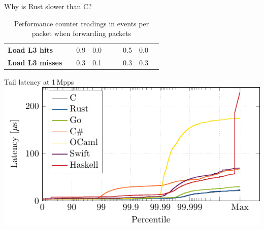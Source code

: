 \documentclass[NET,english,aspectratio=169,notitleframe]{tumbeamer}
\begin{document}
\begin{frame}{Why is Rust slower than C?}
\begin{table}[t]
\begin{tabular}{lrrrrrrrr}
\color{TUMLightGray}		\textbf{Load L3 hits}                     & &\color{TUMLightGray} 0.9 &\color{TUMLightGray} 0.0      &&& \color{TUMLightGray}0.5 & \color{TUMLightGray}0.0 \\
\color{TUMLightGray}		\textbf{Load L3 misses}               & & \color{TUMLightGray}0.3 &\color{TUMLightGray} 0.1         &&& \color{TUMLightGray}0.3 & \color{TUMLightGray}0.3 \\
		\bottomrule
	\end{tabular}
	\caption{Performance counter readings in events per packet when forwarding packets}
	\label{tbl:rust-profiling}
	\vspace{-3em}
\end{table}
\end{frame}




%
%
%
%

\begin{frame}{Tail latency at 1\,Mpps}
\centering\includegraphics[scale=1.1]{figures/latency-1/latency-ccdf.pdf}
\end{frame}
\end{document}
